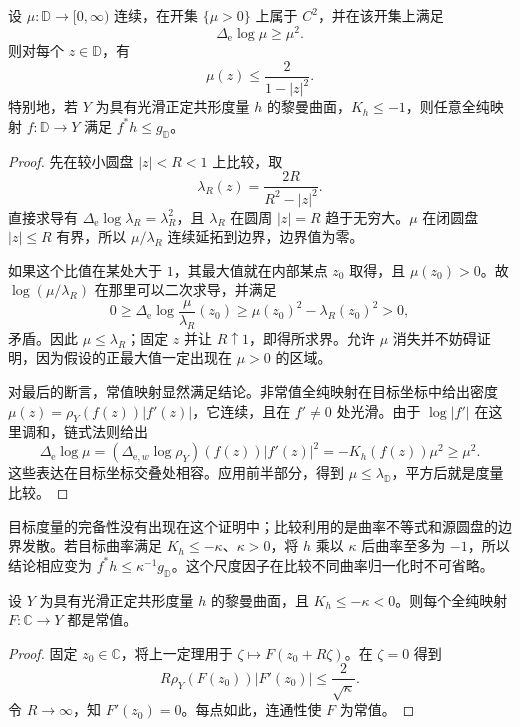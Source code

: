 \begin{theorem}
	\label{g4:thm:0504:ahlfors-schwarz}
	设 \(\mu:\mathbb D\to[0,\infty)\) 连续，在开集 \(\{\mu>0\}\) 上属于 \(C^2\)，并在该开集上满足
	\[
		\Delta_{\mathrm e}\log\mu\ge\mu^2.
	\]
	则对每个 \(z\in\mathbb D\)，有
	\[
		\mu(z)\le\frac2{1-|z|^2}.
	\]
	特别地，若 \(Y\) 为具有光滑正定共形度量 \(h\) 的黎曼曲面，\(K_h\le-1\)，则任意全纯映射 \(f:\mathbb D\to Y\) 满足 \(f^*h\le g_{\mathbb D}\)。
\end{theorem}
\begin{proof}
	先在较小圆盘 \(|z|<R<1\) 上比较，取
	\[
		\lambda_R(z)=\frac{2R}{R^2-|z|^2}.
	\]
	直接求导有 \(\Delta_{\mathrm e}\log\lambda_R=\lambda_R^2\)，且 \(\lambda_R\) 在圆周 \(|z|=R\) 趋于无穷大。\(\mu\) 在闭圆盘 \(|z|\le R\) 有界，所以 \(\mu/\lambda_R\) 连续延拓到边界，边界值为零。

	如果这个比值在某处大于 \(1\)，其最大值就在内部某点 \(z_0\) 取得，且 \(\mu(z_0)>0\)。故 \(\log(\mu/\lambda_R)\) 在那里可以二次求导，并满足
	\[
		0\ge\Delta_{\mathrm e}\log\frac\mu{\lambda_R}(z_0)
		\ge\mu(z_0)^2-\lambda_R(z_0)^2>0,
	\]
	矛盾。因此 \(\mu\le\lambda_R\)；固定 \(z\) 并让 \(R\uparrow1\)，即得所求界。允许 \(\mu\) 消失并不妨碍证明，因为假设的正最大值一定出现在 \(\mu>0\) 的区域。

	对最后的断言，常值映射显然满足结论。非常值全纯映射在目标坐标中给出密度 \(\mu(z)=\rho_Y(f(z))|f'(z)|\)，它连续，且在 \(f'\ne0\) 处光滑。由于 \(\log|f'|\) 在这里调和，链式法则给出
	\[
		\Delta_{\mathrm e}\log\mu
		=(\Delta_{\mathrm e,w}\log\rho_Y)(f(z))|f'(z)|^2
		=-K_h(f(z))\mu^2\ge\mu^2.
	\]
	这些表达在目标坐标交叠处相容。应用前半部分，得到 \(\mu\le\lambda_{\mathbb D}\)，平方后就是度量比较。
\end{proof}

目标度量的完备性没有出现在这个证明中；比较利用的是曲率不等式和源圆盘的边界发散。若目标曲率满足 \(K_h\le-\kappa\)、\(\kappa>0\)，将 \(h\) 乘以 \(\kappa\) 后曲率至多为 \(-1\)，所以结论相应变为 \(f^*h\le\kappa^{-1}g_{\mathbb D}\)。这个尺度因子在比较不同曲率归一化时不可省略。

\begin{corollary}
	\label{g4:cor:0504:entire-negative-curvature}
	设 \(Y\) 为具有光滑正定共形度量 \(h\) 的黎曼曲面，且 \(K_h\le-\kappa<0\)。则每个全纯映射 \(F:\mathbb C\to Y\) 都是常值。
\end{corollary}
\begin{proof}
	固定 \(z_0\in\mathbb C\)，将上一定理用于 \(\zeta\mapsto F(z_0+R\zeta)\)。在 \(\zeta=0\) 得到
	\[
		R\rho_Y(F(z_0))|F'(z_0)|\le\frac2{\sqrt\kappa}.
	\]
	令 \(R\to\infty\)，知 \(F'(z_0)=0\)。每点如此，连通性使 \(F\) 为常值。
\end{proof}

